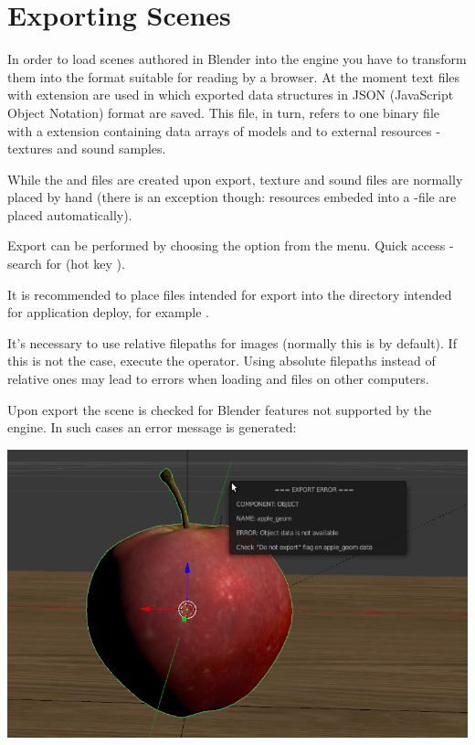 \documentclass[a4paper,12pt,oneside]{sphinxmanual}
\begin{document}

\section{Exporting Scenes}
\label{workflow:index-0}\label{workflow:id3}
In order to load scenes authored in Blender into the engine you have to transform them into the format suitable for reading by a browser. At the moment text files with  extension are used in which exported data structures in JSON (JavaScript Object Notation) format are saved. This file, in turn, refers to one binary file with a  extension containing data arrays of models and to external resources - textures and sound samples.

While the  and  files are created upon export, texture and sound files are normally placed by hand (there is an exception though: resources embeded into a -file are placed automatically).

Export can be performed by choosing the  option from the  menu. Quick access - search for  (hot key ).

It is recommended to place files intended for export into the directory intended for application deploy, for example .

It's necessary to use relative filepaths for images (normally this is by default). If this is not the case, execute the  operator. Using absolute filepaths instead of relative ones may lead to errors when loading  and  files on other computers.

Upon export the scene is checked for Blender features not supported by the engine. In such cases an error message is generated:

{\hfill\includegraphics[width=1.000\linewidth]{error_message.jpg}\hfill}
\end{document}
